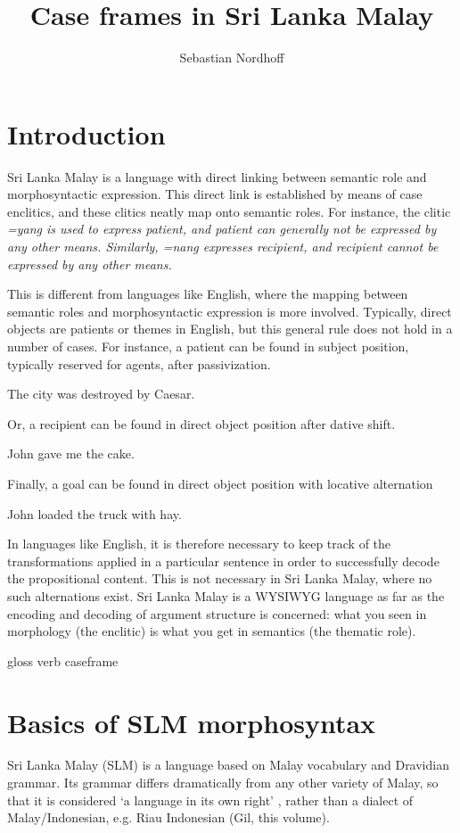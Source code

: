 \documentclass[a4paper,10pt]{article}
\author{Sebastian Nordhoff}
\title{Case frames in Sri Lanka Malay}
\begin{document}
\maketitle

\section{Introduction} 
\let\eachwordtwo=\rm

Sri Lanka Malay is a language with direct linking between semantic role and morphosyntactic expression. This direct link is established by means of case enclitics, and these clitics neatly map onto semantic roles. For instance, the clitic \em =yang \em is used to express patient, and patient can generally not be expressed by any other means. Similarly, \em =nang \em expresses recipient, and recipient cannot be expressed by any other means. 

This is different from languages like English, where the mapping between semantic roles and morphosyntactic expression is more involved. Typically, direct objects are patients or themes in English, but this general rule does not hold in a number of cases. For instance, a patient can be found in subject position, typically reserved for agents, after passivization. 

\ea The city was destroyed by Caesar. \z

Or, a recipient can be found in direct object position after dative shift.

\ea John gave me the cake. \z

Finally, a goal can be found in direct object position with locative alternation

\ea John loaded the truck with hay. \z

In languages like English, it is therefore necessary to keep track of the transformations applied in a particular sentence in order to successfully decode the propositional content. This is not necessary in Sri Lanka Malay, where no such alternations exist. Sri Lanka Malay is a WYSIWYG language \citep{Hengeveldfctransparency,Nordhofffctransparency} as far as the encoding and decoding of argument structure is concerned: what you seen in morphology (the enclitic) is what you get in semantics (the thematic role).


gloss verb caseframe

\section{Basics of SLM morphosyntax}
Sri Lanka Malay (SLM) is a language based on Malay vocabulary and Dravidian grammar. Its grammar differs dramatically from any other variety of Malay, so that it is considered `a language in its own right' \citep{Adelaar1991}, rather than a dialect of Malay/Indonesian, e.g. Riau Indonesian (Gil, this volume).
\end{document}
